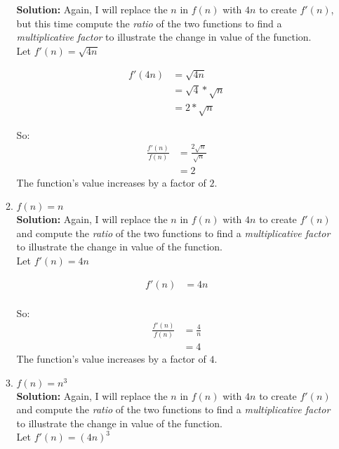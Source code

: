 \documentclass[11pts]{article}
\begin{document}
\begin{enumerate}
\begin{enumerate}
    \textbf{Solution:} Again, I will replace the $n$ in $f(n)$ with
    $4n$ to create $f'(n)$, but this time compute the \emph{ratio} of the two
    functions to find a \emph{multiplicative factor} to illustrate
    the change in value of the function.\\
    Let $f'(n) = \sqrt{4n}$

    \begin{align*}
    f'(4n) &= \sqrt{4n}            \\
           &= \sqrt{4} * \sqrt{n}  \\
           &= 2 * \sqrt{n}
    \end{align*}

    So: 
    \begin{align*}
    \frac{f'(n)}{f(n)} &= \frac{2\sqrt{n}}{\sqrt{n}} \\
                 &= 2
    \end{align*}
    The function's value increases by a factor of $2$. \\

    \item $ f(n)=n $ \\

    \textbf{Solution:} Again, I will replace the $n$ in $f(n)$ with
    $4n$ to create $f'(n)$ and compute the \emph{ratio} of the two
    functions to find a \emph{multiplicative factor} to illustrate
    the change in value of the function.\\
    Let $f'(n) = 4n$

    \begin{align*}
    f'(n) &= 4n            \\
    \end{align*}

    So: 
    \begin{align*}
    \frac{f'(n)}{f(n)} &= \frac{4}{n} \\
                 &= 4
    \end{align*}
    The function's value increases by a factor of $4$. \\

    \item $ f(n)=n^{3} $ \\

    \textbf{Solution:} Again, I will replace the $n$ in $f(n)$ with
    $4n$ to create $f'(n)$ and compute the \emph{ratio} of the two
    functions to find a \emph{multiplicative factor} to illustrate
    the change in value of the function.\\
    Let $f'(n) = (4n)^{3}$


\end{enumerate}
\end{enumerate}
\end{document}
